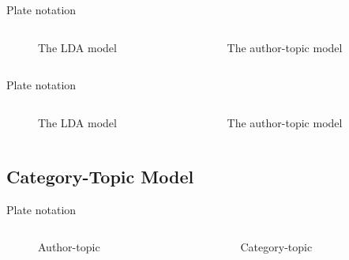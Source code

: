 \begin{frame}{\insertsubsection}{Plate notation}
	\begin{columns}
		\begin{column}{0.45\textwidth}
			\begin{figure}
				\resizebox{\textwidth}{!}{%
				
			}
			\caption*{The LDA model}
			\end{figure}
		\end{column}
		\begin{column}{0.45\textwidth}
			\begin{figure}
				\resizebox{\textwidth}{!}{%
					
				}
				\caption*{The author-topic model}
			\end{figure}
		\end{column}
	\end{columns}
\end{frame}

\begin{frame}{\insertsubsection}{Plate notation}
		\begin{columns}
		\begin{column}{0.38\textwidth}
			\begin{figure}
				\resizebox{\textwidth}{!}{%
					
				}
				\caption*{The LDA model}
			\end{figure}
		\end{column}
		\begin{column}{0.52\textwidth}
			\begin{figure}
				\resizebox{\textwidth}{!}{%
					
				}
				\caption*{The author-topic model}
			\end{figure}
		\end{column}
	\end{columns}
\end{frame}


\subsection{Category-Topic Model}
\begin{frame}{\insertsubsection}{Plate notation}
	\begin{columns}
		\begin{column}{0.45\textwidth}
			\begin{figure}
				\resizebox{\textwidth}{!}{%
					
				}
				\caption*{Author-topic}
			\end{figure}
		\end{column}
		\begin{column}{0.45\textwidth}
			\begin{figure}
				\resizebox{\textwidth}{!}{%
					
				}
				\caption*{Category-topic}
			\end{figure}
		\end{column}
	\end{columns}
\end{frame}

